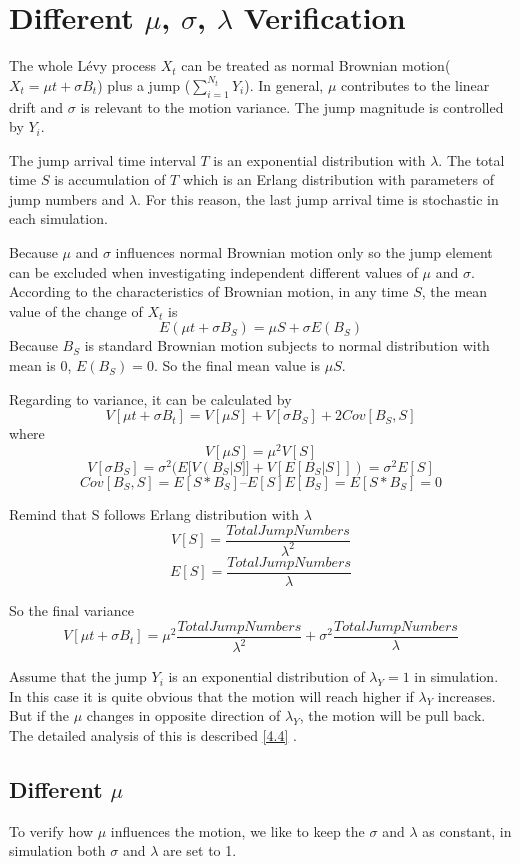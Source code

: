 \section{Different $\mu$, $\sigma$, $\lambda$ Verification}
The whole Lévy process $X_t$ can be treated as normal Brownian motion($X_{t}=\mu t+\sigma B_{t}$) plus a jump ($\sum_{i=1}^{N_{t}} Y_{i}$). In general, $\mu$ contributes to the linear drift and $\sigma$ is relevant to the motion variance. The jump magnitude is controlled by $Y_i$.

The jump arrival time interval $T$ is an exponential distribution with $\lambda$. The total time $S$ is accumulation of $T$ which is an Erlang distribution with parameters of jump numbers and $\lambda$. For this reason, the last jump arrival time is stochastic in each simulation.

Because $\mu$ and $\sigma$ influences normal Brownian motion only so the jump element can be excluded when investigating independent different values of $\mu$ and $\sigma$. According to the characteristics of Brownian motion, in any time $S$, the mean value of the change of $X_t$ is 
$$ E(\mu t+\sigma B_{S})=\mu S+\sigma E(B_S)$$
Because $B_S$ is standard Brownian motion subjects to normal distribution with mean is $0$, $E(B_S)=0$. So the final mean value is $\mu S$.

Regarding to variance, it can be calculated by
$$V[\mu t+\sigma B_{t}]=V[\mu S]+V[\sigma B_{S}]+2Cov[B_{S}, S]$$
where
$$V[\mu S]=\mu^2 V[S] $$
$$V[\sigma B_S]=\sigma^2(E[V(B_S|S]] + V[E[B_S|S]])= \sigma^2 E[S]$$
$$Cov[B_{S}, S]=E[S*B_S] – E[S]E[B_S] = E[S*B_S]=0$$

Remind that S follows Erlang distribution with $\lambda$ $$V[S]=\frac{Total Jump Numbers}{\lambda^2}$$
$$E[S]=\frac{Total Jump Numbers}{\lambda}$$

So the final variance
$$V[\mu t+\sigma B_{t}]=\mu^2 {\frac{Total Jump Numbers}{\lambda^2}}+ \sigma^2 {\frac{Total Jump Numbers}{\lambda}}$$

Assume that the jump $Y_i$ is an exponential distribution of $\lambda_Y=1$ in simulation. In this case it is quite obvious that the motion will reach higher if $\lambda_Y$ increases. But if the $\mu$ changes in opposite direction of $\lambda_Y$, the motion will be pull back. The detailed analysis of this is described \ref{4.4} .

\subsection{Different $\mu$}
To verify how $\mu$ influences the motion, we like to keep the $\sigma$ and $\lambda$ as constant, in simulation both $\sigma$ and $\lambda$ are set to 1.

